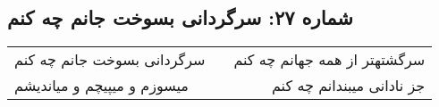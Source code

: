 \begin{center}
\section*{شماره ۲۷: سرگردانی بسوخت جانم چه کنم}
\label{sec:027}
\begin{longtable}{l p{0.5cm} r}
سرگردانی بسوخت جانم چه کنم
&&
سرگشتهتر از همه جهانم چه کنم
\\
میسوزم و میپیچم و میاندیشم
&&
جز نادانی میبندانم چه کنم
\\
\end{longtable}
\end{center}
